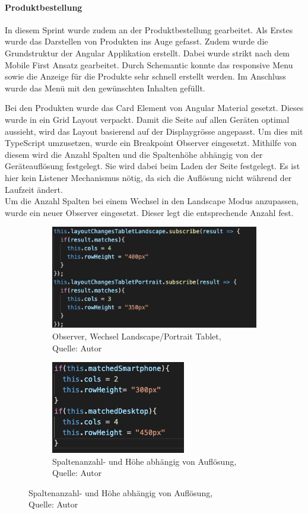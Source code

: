 \paragraph{Produktbestellung}
In diesem Sprint wurde zudem an der Produktbestellung gearbeitet. Als Erstes wurde das Darstellen von Produkten ins Auge gefasst. Zudem wurde die Grundstruktur der Angular Applikation erstellt. 
Dabei wurde strikt nach dem Mobile First Ansatz gearbeitet. Durch Schemantic konnte das responsive Menu sowie die Anzeige für die Produkte sehr schnell erstellt werden. Im Anschluss wurde das Menü mit den gewünschten Inhalten gefüllt. 

Bei den Produkten wurde das Card Element von Angular Material gesetzt. Dieses wurde in ein Grid Layout verpackt. Damit die Seite auf allen Geräten optimal aussieht, wird das Layout basierend auf der Displaygrösse angepasst. Um dies mit TypeScript umzusetzen, wurde ein Breakpoint Observer eingesetzt. Mithilfe von diesem wird die Anzahl Spalten und die Spaltenhöhe abhängig von der Geräteauflösung festgelegt. Sie wird dabei beim Laden der Seite festgelegt. Es ist hier kein Listener Mechanismus nötig, da sich die Auflösung nicht während der Laufzeit ändert.\\ Um die Anzahl Spalten bei einem Wechsel in den Landscape Modus anzupassen, wurde ein neuer Observer eingesetzt. Dieser legt die entsprechende Anzahl fest. 
\begin{figure}[H]
	\begin{subfigure}[b]{0.4\textwidth}
		\includegraphics[scale=0.4]{images/rowsLand.PNG}
		\caption[Observer, Wechsel Landscape/Portrait Tablet]{Observer, Wechsel Landscape/Portrait Tablet,\\ Quelle: Autor}
		\label{img: Landscape observer}
	\end{subfigure}
	\hfill
	\begin{subfigure}[b]{0.4\textwidth}
		\includegraphics[scale=0.6]{images/rowsRes.PNG}
		\caption[Spaltenanzahl- und Höhe abhängig von Auflösung]{Spaltenanzahl- und Höhe abhängig von Auflösung,\\ Quelle: Autor}
		\label{img: Resolution Observer}
	\end{subfigure}
\end{figure} 

